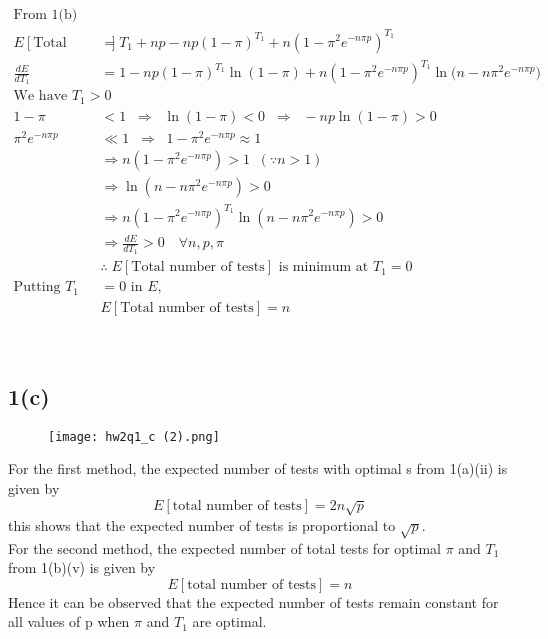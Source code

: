 \documentclass[12pt]{article}
\begin{document}
\begin{align*}
\text{From 1(b)(iv), we have,} \\
E[\text{Total number of tests}] 
&= T_1 + n p - n p (1-\pi)^{T_1} + n (1-\pi^2 e^{-n \pi p})^{T_1} \\[6pt]
\frac{dE}{dT_1} 
&= 1 - n p (1-\pi)^{T_1} \ln(1-\pi) 
   + n (1-\pi^2 e^{-n \pi p})^{T_1} \ln\!\big(n - n \pi^2 e^{-n \pi p}\big) \\[6pt]
\text{We have } T_1 > 0 \\[6pt]
1 - \pi &< 1 \;\;\Rightarrow\;\; \ln(1-\pi) < 0 
   \;\;\Rightarrow\;\; - n p \ln(1-\pi) > 0 \\[6pt]
\pi^2 e^{-n \pi p} &\ll 1 
   \;\;\Rightarrow\;\; 1 - \pi^2 e^{-n \pi p} \approx 1 \\[6pt]
&\Rightarrow n(1-\pi^2 e^{-n \pi p}) > 1 \;\; (\because n > 1) \\[6pt]
&\Rightarrow \ln(n - n \pi^2 e^{-n \pi p}) > 0 \\[6pt]
&\Rightarrow n (1-\pi^2 e^{-n \pi p})^{T_1} 
   \ln(n - n \pi^2 e^{-n \pi p}) > 0 \\[6pt]
&\Rightarrow \frac{dE}{dT_1} > 0 \quad \forall n,p,\pi \\[6pt]
&\therefore \; E[\text{Total number of tests}] 
   \text{ is minimum at } T_1 = 0 \\[12pt]
\text{Putting } T_1 &= 0 \text{ in } E, \\
&E[\text{Total number of tests}] = n
\end{align*}
\begin{center}
     \\[6pt]
\end{center}




\subsection{1(c)}
\begin{figure}[h]
\centering
\texttt{[image: hw2q1\_c (2).png]}
\end{figure}

For the first method, the expected number of tests with optimal s from 1(a)(ii) is given by 
\[ E[\text{total number of tests}] = 2n\sqrt{p}\]
this shows that the expected number of tests is proportional to $\sqrt{p}$. \\
For the second method, the expected number of total tests for optimal $\pi$ and $T_1$ from 1(b)(v) is given by
\[ E[\text{total number of tests}]=n\]
Hence it can be observed that the expected number of tests remain constant for all values of p when $\pi$ and $T_1$ are optimal.
\end{document}
